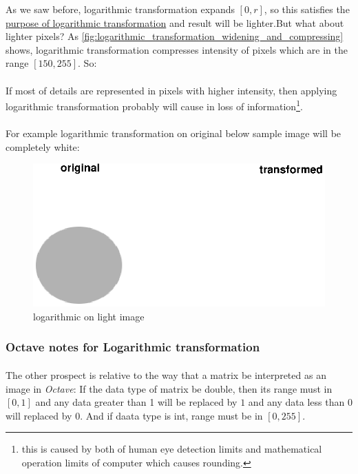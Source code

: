 As we saw before, logarithmic transformation expands $[0,r]$, so this satisfies
the \hyperref[purpose_of_logarithmic_transformation] {purpose of logarithmic
transformation} and result will be lighter.But what about lighter pixels? As 
\autoref{fig:logarithmic_transformation_widening_and_compressing} shows, 
logarithmic transformation compresses intensity of pixels which are in the 
range $[150,255]$. So:

\paragraph*{}\care
    If most of details are represented in pixels with higher intensity, then
    applying logarithmic transformation probably will cause in loss of 
    information\footnote{this is caused by both of human eye detection limits 
    and mathematical operation limits of computer which causes rounding.}. 
    
\paragraph{}For example logarithmic transformation on original below sample
image will be completely white:
    \begin{figure}[htb!]
        \includegraphics[scale=0.4]{logarithmic_on_light_image.eps}
        \centering
        \caption{logarithmic on light image}
        \label{fig:logarithmic_on_light_image}
\end{figure}

\subsubsection{Octave notes for Logarithmic transformation}
\label{Octave_notes_for_Logarithmic_transformation}

\paragraph{}The other prospect is relative to the way that a matrix be interpreted as an
image in \emph{Octave}: If the data type of matrix be double, then its range
must in $[0,1]$ and any data greater than 1 will be replaced by $1$ 
and any data less than $0$ will replaced by $0$. And if daata type is int,
range must be in $[0,255]$.

